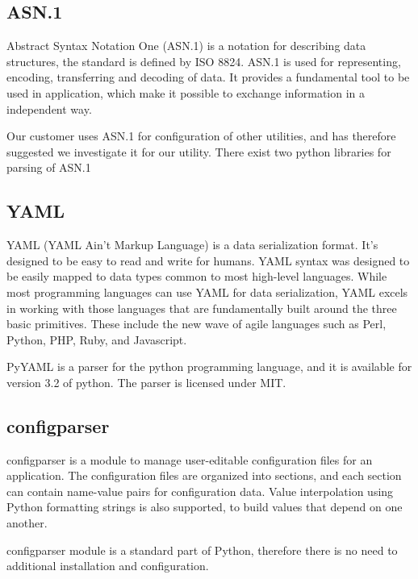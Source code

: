 \begin{description}
\subsection{ASN.1}
Abstract Syntax Notation One (ASN.1) is a notation for describing data
structures, the standard is defined by ISO 8824. ASN.1 is used for
representing, encoding, transferring and decoding of data. It provides a
fundamental tool to be used in application, which make it possible to exchange
information in a independent way.

Our customer uses ASN.1 for configuration of other utilities, and has therefore
suggested we investigate it for our utility. There exist two python libraries
for parsing of ASN.1

\subsection{YAML}
YAML (YAML Ain't Markup Language) is a data serialization format. It's designed
to be easy to read and write for humans. YAML syntax was designed to be easily
mapped to data types common to most high-level languages. While most
programming languages can use YAML for data serialization, YAML excels in
working with those languages that are fundamentally built around the three
basic primitives. These include the new wave of agile languages such as Perl,
Python, PHP, Ruby, and Javascript.

PyYAML is a parser for the python programming language, and it is available for
version 3.2 of python. The parser is licensed under MIT.

\subsection{configparser}
configparser is a module to manage user-editable configuration files for an
application. The configuration files are organized into sections, and each
section can contain name-value pairs for configuration data. Value
interpolation using Python formatting strings is also supported, to build
values that depend on one another.

configparser module is a standard part of Python, therefore there is no need
to additional installation and configuration.


\end{description}
